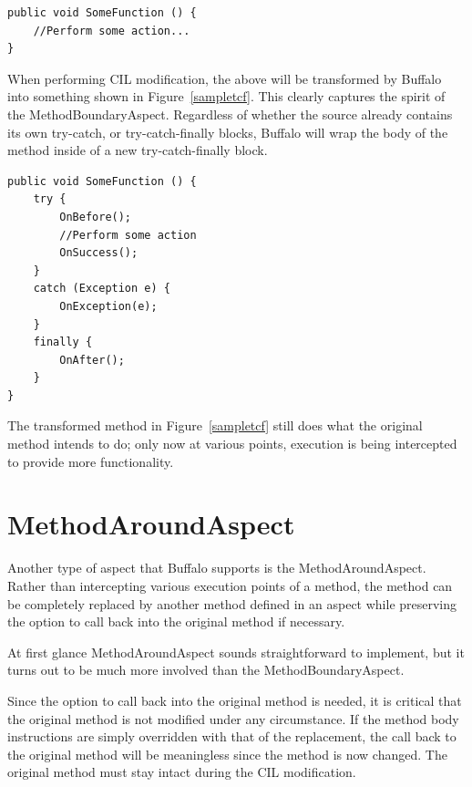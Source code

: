 \begin{minipage}{\textwidth}
\begin{lstlisting}[caption={Sample Function}, label=samplefunction]
public void SomeFunction () {
    //Perform some action...
}
\end{lstlisting}
\end{minipage}

When performing CIL modification, the above will be transformed by Buffalo into something shown in Figure~\ref{sampletcf}. This clearly captures the spirit of the MethodBoundaryAspect. Regardless of whether the source already contains its own try-catch, or try-catch-finally blocks, Buffalo will wrap the body of the method inside of a new try-catch-finally block.

\begin{minipage}{\textwidth}
\begin{lstlisting}[caption={Sample Try-catch-finally}, label=sampletcf]
public void SomeFunction () {
    try {
        OnBefore();
        //Perform some action
        OnSuccess();
    }
    catch (Exception e) {
        OnException(e);
    }
    finally {
        OnAfter();
    }
}
\end{lstlisting}
\end{minipage}

The transformed method in Figure~\ref{sampletcf} still does what the original method intends to do; only now at various points, execution is being intercepted to provide more functionality. 

\section{MethodAroundAspect}
Another type of aspect that Buffalo supports is the MethodAroundAspect. Rather than intercepting various execution points of a method, the method can be completely replaced by another method defined in an aspect while preserving the option to call back into the original method if necessary.

At first glance MethodAroundAspect sounds straightforward to implement, but it turns out to be much more involved than the MethodBoundaryAspect.

Since the option to call back into the original method is needed, it is critical that the original method is not modified under any circumstance. If the method body instructions are simply overridden with that of the replacement, the call back to the original method will be meaningless since the method is now changed. The original method must stay intact during the CIL modification.

